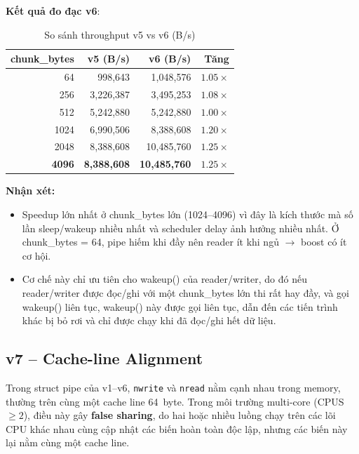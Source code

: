 \documentclass[12pt,a4paper]{article}
\newcommand{\code}[1]{\texttt{#1}}
\begin{document}
\textbf{Kết quả đo đạc v6}:
\begin{table}[H]
\centering
\caption{So sánh throughput v5 vs v6 (B/s)}
\begin{tabular}{rrrr}
\toprule
\textbf{chunk\_bytes} & \textbf{v5 (B/s)} & \textbf{v6 (B/s)} & \textbf{Tăng} \\
\midrule
64   & 998,643   & 1,048,576  & $1.05\times$ \\
256  & 3,226,387 & 3,495,253  & $1.08\times$ \\
512  & 5,242,880 & 5,242,880  & $1.00\times$ \\
1024 & 6,990,506 & 8,388,608  & $1.20\times$ \\
2048 & 8,388,608 & 10,485,760 & $1.25\times$ \\
\textbf{4096} & \textbf{8,388,608} & \textbf{10,485,760} & $\boldsymbol{1.25\times}$ \\
\bottomrule
\end{tabular}
\end{table}

\textbf{Nhận xét:}
\begin{itemize}
    \item[+] Speedup lớn nhất ở chunk\_bytes lớn (1024--4096) vì đây là kích thước
mà số lần sleep/wakeup nhiều nhất và scheduler delay ảnh hưởng nhiều nhất. Ở chunk\_bytes = 64, pipe hiếm khi đầy nên reader ít khi ngủ $\to$ boost có ít cơ hội.
    \item[+] Cơ chế này chỉ ưu tiên cho wakeup() của reader/writer, do đó nếu reader/writer được đọc/ghi với một chunk\_bytes lớn thi rất hay đầy, và gọi wakeup() liên tục, wakeup() này được 
    gọi liên tục, dẫn đến các tiến trình khác bị bỏ rơi và chỉ được chạy khi đã đọc/ghi hết dữ liệu. 
\end{itemize}


\subsection{v7 -- Cache-line Alignment}

Trong struct pipe của v1--v6, \code{nwrite} và \code{nread} nằm cạnh nhau trong memory,
thường trên cùng một cache line 64~byte. Trong môi trường multi-core
(CPUS $\geq 2$), điều này gây \textbf{false sharing}, do hai hoặc nhiều luồng chạy trên các lõi 
CPU khác nhau cùng cập nhật các biến hoàn toàn độc lập, nhưng các biến này lại nằm cùng một cache line. \\
\end{document}
